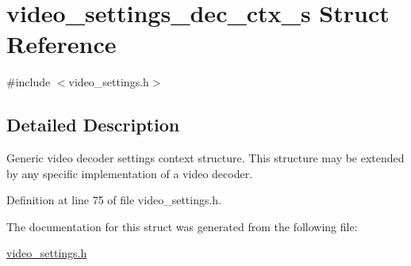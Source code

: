 \hypertarget{structvideo__settings__dec__ctx__s}{}\section{video\+\_\+settings\+\_\+dec\+\_\+ctx\+\_\+s Struct Reference}
\label{structvideo__settings__dec__ctx__s}


{\ttfamily \#include $<$video\+\_\+settings.\+h$>$}



\subsection{Detailed Description}
Generic video decoder settings context structure. This structure may be extended by any specific implementation of a video decoder. 

Definition at line 75 of file video\+\_\+settings.\+h.



The documentation for this struct was generated from the following file\+:\begin{DoxyCompactItemize}
\item 
\hyperlink{video__settings_8h}{video\+\_\+settings.\+h}\end{DoxyCompactItemize}
